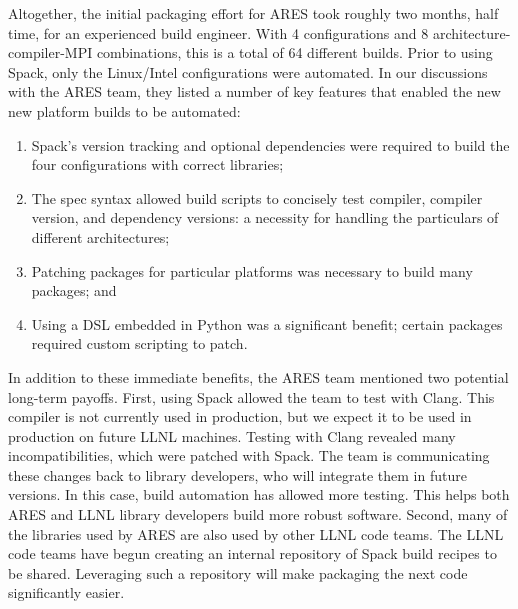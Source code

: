 Altogether, the initial packaging effort for ARES took roughly two months,
half time, for an experienced build engineer.  With 4 configurations and 8
architecture-compiler-MPI combinations, this is a total of 64 different builds.
Prior to using Spack, only the Linux/Intel configurations were automated.
In our discussions with the ARES team, they listed a number of key features
that enabled the new new platform builds to be automated:
\begin{enumerate}
\item Spack's version tracking and optional dependencies were required to
      build the four configurations with correct libraries;
\item The spec syntax allowed build scripts to concisely test compiler,
      compiler version, and dependency versions: a necessity
      for handling the particulars of different architectures;
\item Patching packages for particular platforms was
      necessary to build many packages; and
\item Using a DSL embedded in Python was a significant benefit;
      certain packages required custom scripting to patch.
\end{enumerate}

In addition to these immediate benefits, the ARES team mentioned
two potential long-term payoffs. First, using Spack allowed
the team to test with Clang.  This compiler is not currently used in
production, but we expect it to be used in production on future LLNL machines.
Testing with Clang revealed many incompatibilities, which were patched with
Spack. The team is communicating these changes back to library developers,
who will integrate them in future versions.  In this case, build automation
has allowed more testing. This helps both ARES and LLNL library developers
build more robust software.
%
Second, many of the libraries used by ARES are also used by other LLNL code
teams.  The LLNL code teams have begun creating an internal repository of
Spack build recipes to be shared.  Leveraging such a repository will
make packaging the next code significantly easier.
